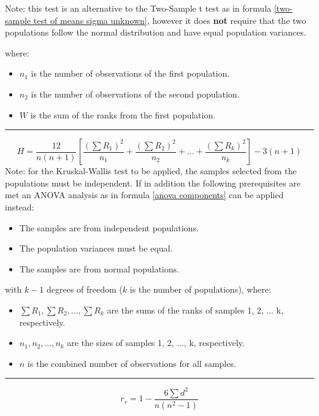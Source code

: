 \documentclass[	DIV=calc,%
							paper=a4,%
							fontsize=11pt,%
							twocolumn]{scrartcl} %
\newcommand{\hformbar}[1]{\vspace{5pt}\hrule\vspace{10pt}} %
\newcommand{\formdesc}[1]{\noindent\textbf{#1}}
\begin{document}
Note: this test is an alternative to the Two-Sample t test as in formula \eqref{two-sample test of means sigma unknown}, however it does \textbf{not} require that the two populations follow the normal distribution and have equal population variances.

where:
\begin{itemize}
 \item $n_1$ is the number of observations of the first population.
 \item $n_2$ is the number of observations of the second population.
 \item $W$ is the sum of the ranks from the first population.
\end{itemize}
\hformbar


\formdesc{Kruskal-Wallis Test}
\begin{equation}
\label{kruskal wallis test}
H = \frac{12}{n(n + 1)}\left[\frac{(\sum R_1)^2}{n_1} + \frac{(\sum R_2)^2}{n_2} + ... + \frac{(\sum R_k)^2}{n_k}\right] - 3(n+1) 
\end{equation}
Note: for the Kruskal-Wallis test to be applied, the samples selected from the populations must be independent. If in addition the following prerequisites are met an ANOVA analysis as in formula \eqref{anova components} can be applied instead:
\begin{itemize}
 \item The samples are from independent populations.
 \item The population variances must be equal.
 \item The samples are from normal populations.
\end{itemize}

with $k-1$ degrees of freedom ($k$ is the number of populations), where:
\begin{itemize}
 \item $\sum R_1, \sum R_2, ..., \sum R_k$ are the sums of the ranks of samples 1, 2, ... k, respectively.
 \item $n_1, n_2, ..., n_k$ are the sizes of samples 1, 2, ..., k, respectively.
 \item $n$ is the combined number of observations for all samples.
\end{itemize}
\hformbar


\formdesc{Spearman's Coefficient of Rank Correlation}
\begin{equation}
\label{spearman coefficient}
r_s = 1 - \frac{6\sum d^2}{n(n^2 - 1)}
\end{equation}
\end{document}
